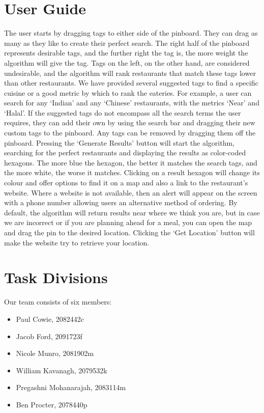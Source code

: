 \documentclass[10pt,a4paper]{article}
\begin{document}
\section*{User Guide}

The user starts by dragging tags to either side of the pinboard. They can drag as many as they like to create their perfect search. The right half of the pinboard represents desirable tags, and the further right the tag is, the more weight the algorithm will give the tag. Tags on the left, on the other hand, are considered undesirable, and the algorithm will rank restaurants that match these tags lower than other restaurants. We have provided several suggested tags to find a specific cuisine or a good metric by which to rank the eateries. For example, a user can search for any ‘Indian’ and any ‘Chinese’ restaurants, with the metrics ‘Near’ and ‘Halal’. If the suggested tags do not encompass all the search terms the user requires, they can add their own by using the search bar and dragging their new custom tags to the pinboard. Any tags can be removed by dragging them off the pinboard. Pressing the ‘Generate Results’ button will start the algorithm, searching for the perfect restaurants and displaying the results as color-coded hexagons. The more blue the hexagon, the better it matches the search tags, and the more white, the worse it matches. Clicking on a result hexagon will change its colour and offer options to find it on a map and also a link to the restaurant’s website. Where a website is not available, then an alert will appear on the screen with a phone  number allowing users an alternative method of ordering. By default, the algorithm will return results near where we think you are, but in case we are incorrect or if you are planning ahead for a meal, you can open the map and drag the pin to the desired location. Clicking the ‘Get Location’ button will make the website try to retrieve your location. 

\section*{Task Divisions}

Our team consists of six members:
\begin{itemize}
	\item Paul Cowie, 2082442c
	\item Jacob Ford, 2091723f
	\item Nicole Munro, 2081902m
	\item William Kavanagh, 2079532k
	\item Pregashni Mohanarajah, 2083114m
	\item Ben Procter, 2078440p
\end{itemize}
\end{document}
